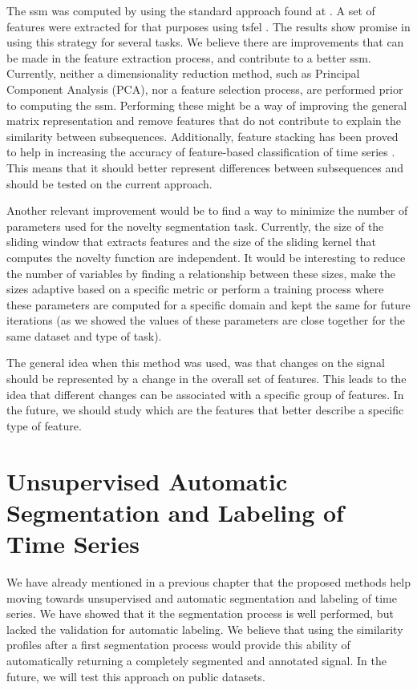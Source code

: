 The \gls{ssm} was computed by using the standard approach found at \cite{muller, fmp}. A set of features were extracted for that purposes using \gls{tsfel} \cite{tsfel}. The results show promise in using this strategy for several tasks. We believe there are improvements that can be made in the feature extraction process, and contribute to a better \gls{ssm}. Currently, neither a dimensionality reduction method, such as Principal Component Analysis (PCA), nor a feature selection process, are performed prior to computing the \gls{ssm}. Performing these might be a way of improving the general matrix representation and remove features that do not contribute to explain the similarity between subsequences. Additionally, feature stacking has been proved to help in increasing the accuracy of feature-based classification of time series \cite{feature_stacking}. This means that it should better represent differences between subsequences and should be tested on the current approach.
\par
Another relevant improvement would be to find a way to minimize the number of parameters used for the novelty segmentation task. Currently, the size of the sliding window that extracts features and the size of the sliding kernel that computes the novelty function are independent. It would be interesting to reduce the number of variables by finding a relationship between these sizes, make the sizes adaptive based on a specific metric or perform a training process where these parameters are computed for a specific domain and kept the same for future iterations (as we showed the values of these parameters are close together for the same dataset and type of task).
\par
The general idea when this method was used, was that changes on the signal should be represented by a change in the overall set of features. This leads to the idea that different changes can be associated with a specific group of features. In the future, we should study which are the features that better describe a specific type of feature.

\section{Unsupervised Automatic Segmentation and Labeling of Time Series}

We have already mentioned in a previous chapter that the proposed methods help moving towards unsupervised and automatic segmentation and labeling of time series. We have showed that it the segmentation process is well performed, but lacked the validation for automatic labeling. We believe that using the similarity profiles after a first segmentation process would provide this ability of automatically returning a completely segmented and annotated signal. In the future, we will test this approach on public datasets.

